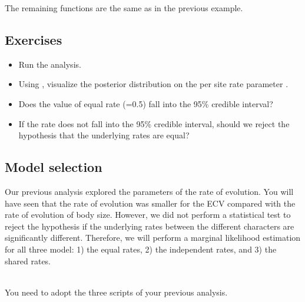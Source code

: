 The remaining functions are the same as in the previous example.


\subsection*{Exercises}

\begin{itemize}
\item
Run the analysis.
\item
Using , visualize the posterior distribution on the per site rate parameter .
\item 
Does the value of equal rate (=0.5) fall into the 95\% credible interval?
\item
If the rate does not fall into the 95\% credible interval, should we reject the hypothesis that the underlying rates are equal?
\end{itemize}

\vspace{5cm}






\subsection{Model selection}
Our previous analysis explored the parameters of the rate of evolution. You will have seen that the rate of evolution was smaller for the ECV compared with the rate of evolution of body size. However, we did not perform a statistical test to reject the hypothesis if the underlying rates between the different characters are significantly different. Therefore, we will perform a marginal likelihood estimation for all three model: 1) the equal rates, 2) the independent rates, and 3) the shared rates.

\noindent \\ \impmark You need to adopt the three scripts of your previous analysis.

